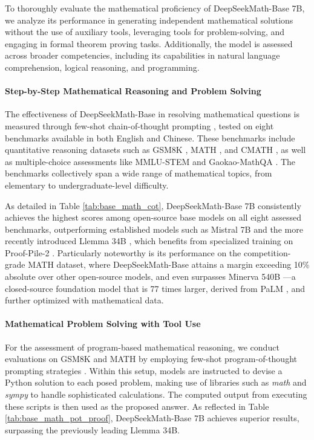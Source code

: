To thoroughly evaluate the mathematical proficiency of DeepSeekMath-Base 7B, we analyze its performance in generating independent mathematical solutions without the use of auxiliary tools, leveraging tools for problem-solving, and engaging in formal theorem proving tasks. Additionally, the model is assessed across broader competencies, including its capabilities in natural language comprehension, logical reasoning, and programming.

\paragraph{Step-by-Step Mathematical Reasoning and Problem Solving}

The effectiveness of DeepSeekMath-Base in resolving mathematical questions is measured through few-shot chain-of-thought prompting \citep{cot}, tested on eight benchmarks available in both English and Chinese. These benchmarks include quantitative reasoning datasets such as GSM8K \citep{gsm8k}, MATH \citep{MATH}, and CMATH \citep{wei2023cmath}, as well as multiple-choice assessments like MMLU-STEM \citep{mmlu} and Gaokao-MathQA \citep{agieval}. The benchmarks collectively span a wide range of mathematical topics, from elementary to undergraduate-level difficulty.

As detailed in Table \ref{tab:base_math_cot}, DeepSeekMath-Base 7B consistently achieves the highest scores among open-source base models on all eight assessed benchmarks, outperforming established models such as Mistral 7B \citep{mistral} and the more recently introduced Llemma 34B \citep{llemma}, which benefits from specialized training on Proof-Pile-2 \citep{llemma}. Particularly noteworthy is its performance on the competition-grade MATH dataset, where DeepSeekMath-Base attains a margin exceeding 10\% absolute over other open-source models, and even surpasses Minerva 540B \citep{minerva}—a closed-source foundation model that is 77 times larger, derived from PaLM \citep{palm}, and further optimized with mathematical data.

\paragraph{Mathematical Problem Solving with Tool Use}  
For the assessment of program-based mathematical reasoning, we conduct evaluations on GSM8K and MATH by employing few-shot program-of-thought prompting strategies \citep{pot,pal}. Within this setup, models are instructed to devise a Python solution to each posed problem, making use of libraries such as \textit{math} and \textit{sympy} to handle sophisticated calculations. The computed output from executing these scripts is then used as the proposed answer. As reflected in Table \ref{tab:base_math_pot_proof}, DeepSeekMath-Base 7B achieves superior results, surpassing the previously leading Llemma 34B.

